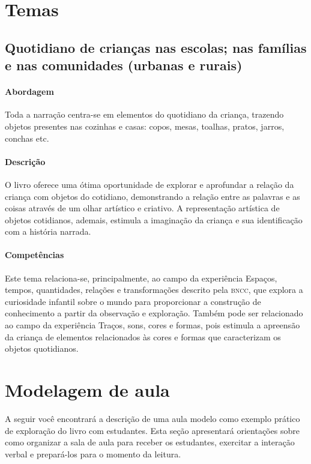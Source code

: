 \documentclass[11pt]{extarticle}
\begin{document}
\section{Temas}

\subsection{Quotidiano de crianças nas escolas; nas famílias e nas comunidades (urbanas e rurais)}

\paragraph{Abordagem} Toda a narração centra-se em elementos do quotidiano da criança, trazendo objetos presentes nas cozinhas e casas: copos, mesas, toalhas, pratos, jarros, conchas etc.

\paragraph{Descrição} O livro oferece uma ótima oportunidade de explorar 
e aprofundar a relação da criança com objetos do cotidiano, demonstrando a relação entre as palavras e as coisas através de um olhar artístico e criativo. A representação artística de objetos cotidianos, ademais, estimula a imaginação da criança e sua identificação com a história narrada.

\paragraph{Competências} Este tema relaciona-se, principalmente, ao 
campo da experiência Espaços, tempos, quantidades, relações e transformações
descrito pela \textsc{bncc}, que explora a curiosidade infantil sobre o mundo 
para proporcionar a construção de conhecimento a partir da observação e exploração.
Também pode ser relacionado ao campo da experiência Traços, sons, cores e formas, pois estimula a apreensão da criança de elementos relacionados às cores e formas que caracterizam os objetos quotidianos.


\section{Modelagem de aula}
A seguir você encontrará a descrição de uma aula modelo como exemplo 
prático de exploração do livro com estudantes. Esta seção apresentará 
orientações sobre como organizar a sala de aula para receber os 
estudantes, exercitar a interação verbal e prepará-los para o 
momento da leitura.
\end{document}
